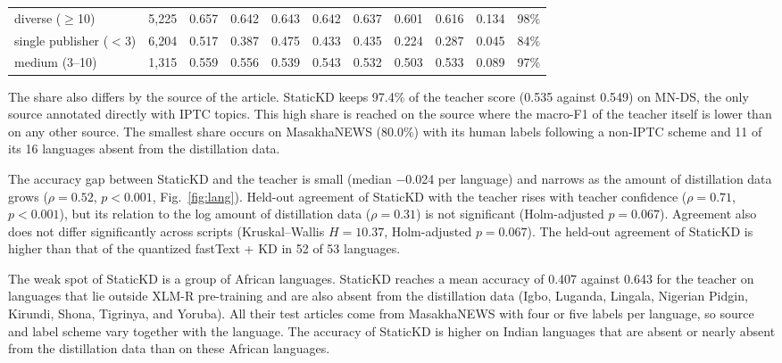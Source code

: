 \documentclass{ieeeaccess}
\begin{document}
\begin{table}[!t]
\begin{tabular}{@{}lrccccccccc@{}}
\quad diverse ($\ge$10) & 5,225 & 0.657 & 0.642 & 0.643 & 0.642 & 0.637 & 0.601 & 0.616 & 0.134 & 98\% \\
\quad single publisher ($<$3) & 6,204 & 0.517 & 0.387 & 0.475 & 0.433 & 0.435 & 0.224 & 0.287 & 0.045 & 84\% \\
\quad medium (3--10) & 1,315 & 0.559 & 0.556 & 0.539 & 0.543 & 0.532 & 0.503 & 0.533 & 0.089 & 97\% \\
\bottomrule
\end{tabular}
\par\vspace{2pt}{\footnotesize Model2Vec is the Model2Vec classifier + KD, fastText (q) is the quantized fastText + KD, and fastText GPT is the subword fastText model trained on GPT-4o labels.\par}
\end{table}

The share also differs by the source of the article. StaticKD keeps 97.4\% of the teacher score (0.535 against 0.549) on MN-DS, the only source annotated directly with IPTC topics. This high share is reached on the source where the macro-F1 of the teacher itself is lower than on any other source. The smallest share occurs on MasakhaNEWS (80.0\%) with its human labels following a non-IPTC scheme and 11 of its 16 languages absent from the distillation data.

The accuracy gap between StaticKD and the teacher is small (median $-$0.024 per language) and narrows as the amount of distillation data grows ($\rho=0.52$, $p<0.001$, Fig.~\ref{fig:lang}). Held-out agreement of StaticKD with the teacher rises with teacher confidence ($\rho=0.71$, $p<0.001$), but its relation to the log amount of distillation data ($\rho=0.31$) is not significant (Holm-adjusted $p=0.067$). Agreement also does not differ significantly across scripts (Kruskal--Wallis $H=10.37$, Holm-adjusted $p=0.067$). The held-out agreement of StaticKD is higher than that of the quantized fastText + KD in 52 of 53 languages.

The weak spot of StaticKD is a group of African languages. StaticKD reaches a mean accuracy of 0.407 against 0.643 for the teacher on languages that lie outside XLM-R pre-training and are also absent from the distillation data (Igbo, Luganda, Lingala, Nigerian Pidgin, Kirundi, Shona, Tigrinya, and Yoruba). All their test articles come from MasakhaNEWS with four or five labels per language, so source and label scheme vary together with the language. The accuracy of StaticKD is higher on Indian languages that are absent or nearly absent from the distillation data than on these African languages.
\end{document}
